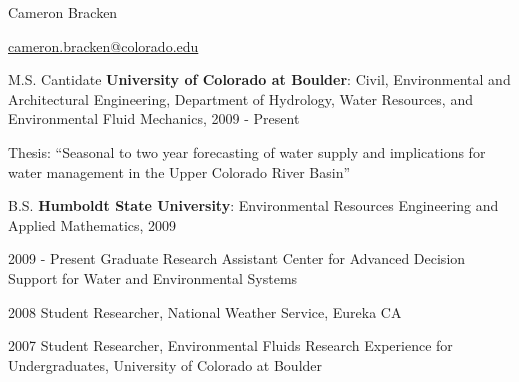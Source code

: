 \documentclass[10pt,a4paper]{scrartcl}
\begin{document}
    \begin{cv}{}
        \begin{cvlist}{}\label{info}  
            \item   Cameron Bracken
            \item   \url{cameron.bracken@colorado.edu}
        \end{cvlist}
        
        \begin{cvlist}{}\label{edu}
            \item[M.S. Cantidate] \textbf{University of Colorado at Boulder}: { Civil, Environmental and Architectural Engineering, Department of Hydrology, Water Resources, and Environmental Fluid Mechanics},  2009 - Present 
            \item Thesis: ``Seasonal to two year forecasting of water supply and implications for water management in the Upper Colorado River Basin''
            \item[B.S.] \textbf{Humboldt State University}: {Environmental Resources Engineering and Applied Mathematics}, 2009
        \end{cvlist}
        
        \begin{cvlist}{}\label{exp}
            {\setlength{\itemsep}{1pt}
            \setlength{\parskip}{0pt}
            \setlength{\parsep}{0pt}
            
            \item[2009 - Present] Graduate Research Assistant Center for Advanced Decision Support for Water and Environmental Systems
            }
            \item[2008] Student Researcher, National Weather Service, Eureka CA
            \item[2007] Student Researcher, Environmental Fluids Research Experience for Undergraduates, University of Colorado at Boulder
        \end{cvlist}
        
        

\end{cv}
\end{document}
